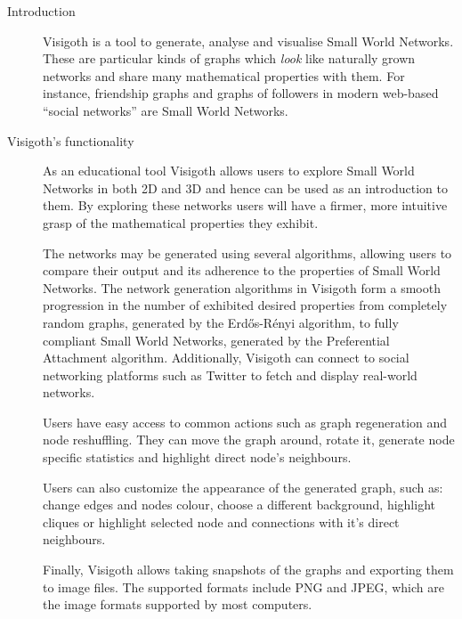 \documentclass[a4paper,11pt,titlepage]{article}
\begin{document}
\begin{description}
	\item[Introduction]

    Visigoth is a tool to generate, analyse and visualise Small World
    Networks. These are particular kinds of graphs which \emph{look} like
    naturally grown networks and share many mathematical properties with them.
    For instance, friendship graphs and graphs of followers in modern web-based
    ``social networks'' are Small World Networks.

	\item[Visigoth's functionality]

    As an educational tool Visigoth allows users to explore Small World Networks
    in both 2D and 3D and hence can be used as an introduction to them. By
    exploring these networks users will have a firmer, more intuitive grasp of
    the mathematical properties they exhibit.

    The networks may be generated using several algorithms, allowing users to
    compare their output and its adherence to the properties of Small World
    Networks. The network generation algorithms in Visigoth form a smooth
    progression in the number of exhibited desired properties from completely
    random graphs, generated by the Erd\H{o}s-R\'{e}nyi algorithm, to fully
    compliant Small World Networks, generated by the Preferential Attachment
    algorithm. Additionally, Visigoth can connect to social networking platforms
    such as Twitter to fetch and display real-world networks.

    Users have easy access to common actions such as graph regeneration and node
    reshuffling. They can move the graph around, rotate it, generate node
    specific statistics and highlight direct node's neighbours.

    Users can also customize the appearance of the generated graph, such as:
    change edges and nodes colour, choose a different background, highlight
    cliques or highlight selected node and connections with it's direct
    neighbours.

    Finally, Visigoth allows taking snapshots of the graphs and exporting them
    to image files. The supported formats include PNG and JPEG, which are the
    image formats supported by most computers.


\end{description}
\end{document}

